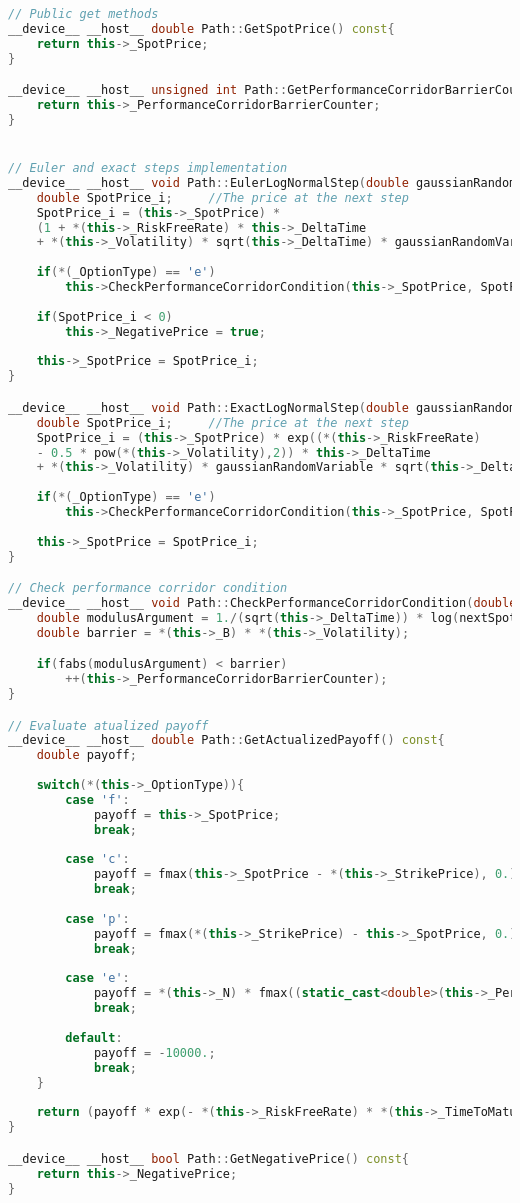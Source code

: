 \begin{lstlisting}[language=C++, caption={\texttt{libraries/CoreLibraries/Path/Path.cu}}]
// Public get methods
__device__ __host__ double Path::GetSpotPrice() const{
	return this->_SpotPrice;
}

__device__ __host__ unsigned int Path::GetPerformanceCorridorBarrierCounter() const{
	return this->_PerformanceCorridorBarrierCounter;
}


// Euler and exact steps implementation
__device__ __host__ void Path::EulerLogNormalStep(double gaussianRandomVariable){
	double SpotPrice_i;		//The price at the next step
	SpotPrice_i = (this->_SpotPrice) *
	(1 + *(this->_RiskFreeRate) * this->_DeltaTime
	+ *(this->_Volatility) * sqrt(this->_DeltaTime) * gaussianRandomVariable);
	
	if(*(_OptionType) == 'e')
		this->CheckPerformanceCorridorCondition(this->_SpotPrice, SpotPrice_i);
		
	if(SpotPrice_i < 0)
		this->_NegativePrice = true;
	
	this->_SpotPrice = SpotPrice_i;
}

__device__ __host__ void Path::ExactLogNormalStep(double gaussianRandomVariable){
	double SpotPrice_i;		//The price at the next step
	SpotPrice_i = (this->_SpotPrice) * exp((*(this->_RiskFreeRate)
	- 0.5 * pow(*(this->_Volatility),2)) * this->_DeltaTime
	+ *(this->_Volatility) * gaussianRandomVariable * sqrt(this->_DeltaTime));
	
	if(*(_OptionType) == 'e')
		this->CheckPerformanceCorridorCondition(this->_SpotPrice, SpotPrice_i);
	
	this->_SpotPrice = SpotPrice_i;
}

// Check performance corridor condition
__device__ __host__ void Path::CheckPerformanceCorridorCondition(double currentSpotPrice, double nextSpotPrice){
	double modulusArgument = 1./(sqrt(this->_DeltaTime)) * log(nextSpotPrice / currentSpotPrice);
	double barrier = *(this->_B) * *(this->_Volatility);

	if(fabs(modulusArgument) < barrier)
		++(this->_PerformanceCorridorBarrierCounter);
}

// Evaluate atualized payoff
__device__ __host__ double Path::GetActualizedPayoff() const{
	double payoff;
	
	switch(*(this->_OptionType)){
		case 'f':
			payoff = this->_SpotPrice;
			break;
		
		case 'c':
			payoff = fmax(this->_SpotPrice - *(this->_StrikePrice), 0.);
			break;
		
		case 'p':
			payoff = fmax(*(this->_StrikePrice) - this->_SpotPrice, 0.);
			break;
		
		case 'e':
			payoff = *(this->_N) * fmax((static_cast<double>(this->_PerformanceCorridorBarrierCounter) / *(this->_NumberOfIntervals)) - *(this->_K), 0.);
			break;
			
		default:
			payoff = -10000.;
			break;
	}	
	
	return (payoff * exp(- *(this->_RiskFreeRate) * *(this->_TimeToMaturity)));
}

__device__ __host__ bool Path::GetNegativePrice() const{
	return this->_NegativePrice;
}
\end{lstlisting}

